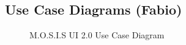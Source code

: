 \subsection{Use Case Diagrams (Fabio)}
\begin{figure}[H]
	\caption{M.O.S.I.S UI 2.0 Use Case Diagram}
\end{figure}